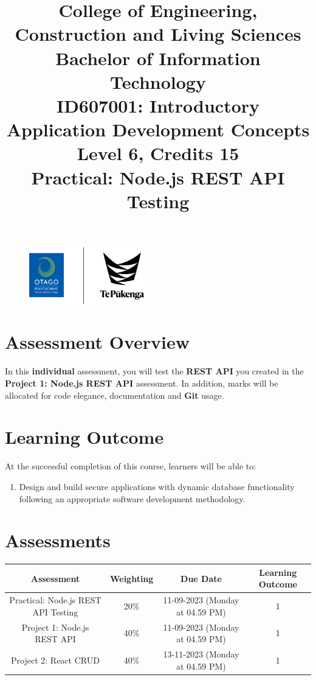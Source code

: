 \documentclass{article}
\author{}
\begin{document}
\begin{figure}
    \centering
    \includegraphics[width=50mm]{../img/logo.png}
\end{figure}

\title{College of Engineering, Construction and Living Sciences\\Bachelor of Information Technology\\ID607001: Introductory Application Development Concepts\\Level 6, Credits 15\\\textbf{Practical: Node.js REST API Testing}}
\date{}
\maketitle

\section*{Assessment Overview}
In this \textbf{individual} assessment, you will test the \textbf{REST API} you created in the \textbf{Project 1: Node.js REST API} assessment. In addition, marks will be allocated for code elegance, documentation and \textbf{Git} usage.  

\section*{Learning Outcome}
At the successful completion of this course, learners will be able to:
\begin{enumerate}
    \item Design and build secure applications with dynamic database functionality following an appropriate software development methodology.
\end{enumerate}

\section*{Assessments}
\renewcommand{\arraystretch}{1.5}
\begin{tabular}{|c|c|c|c|}
	\hline
	\textbf{Assessment}                                 & \textbf{Weighting} & \textbf{Due Date}            & \textbf{Learning Outcome} \\ \hline
	\small Practical: Node.js REST API Testing & \small 20\%        & \small 11-09-2023 (Monday at 04.59 PM)   & \small 1                   \\ \hline
	\small Project 1: Node.js REST API                  & \small 40\%        & \small \small 11-09-2023 (Monday at 04.59 PM) & \small 1                   \\ \hline
	\small Project 2: React CRUD                        & \small 40\%        & \small 13-11-2023 (Monday at 04.59 PM)  & \small 1                   \\ \hline
\end{tabular}
\end{document}
